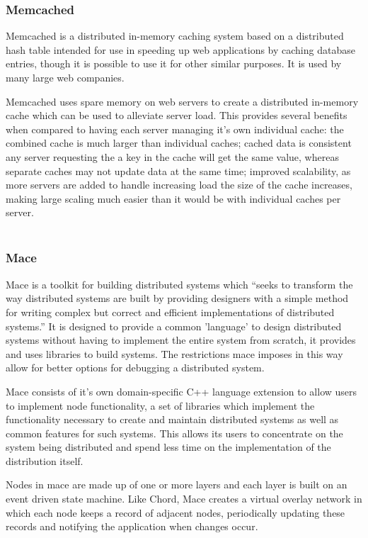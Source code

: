 \documentclass{article}
\begin{document}
\subsubsection{Memcached} 
Memcached\cite{memcached} is a distributed in-memory caching system based on a distributed hash table intended for use in speeding up web applications by caching database entries, though it is possible to use it for other similar purposes. It is used by many large web companies.

Memcached uses spare memory on web servers to create a distributed in-memory cache which can be used to alleviate server load. This provides several benefits when compared to having each server managing it's own individual cache: the combined cache is much larger than individual caches; cached data is consistent any server requesting the a key in the cache will get the same value, whereas separate caches may not update data at the same time; improved scalability, as more servers are added to handle increasing load the size of the cache increases, making large scaling much easier than it would be with individual caches per server.
\\
\\


\subsubsection{Mace} 
Mace\cite{mace} is a toolkit for building distributed systems which “seeks to transform the way distributed systems are built by providing designers with a simple method for writing complex but correct and efficient implementations of distributed systems.” \cite{mace_quote} It is designed to provide a common 'language' to design distributed systems without having to implement the entire system from scratch, it provides and uses libraries to build systems. The restrictions mace imposes in this way allow for better options for debugging a distributed system.

Mace consists of it's own domain-specific C++ language extension to allow users to implement node functionality, a set of libraries which implement the functionality necessary to create and maintain distributed systems as well as common features for such systems. This allows its users to concentrate on the system being distributed and spend less time on the implementation of the distribution itself.

Nodes in mace are made up of one or more layers and each layer is built on an event driven state machine. Like Chord, Mace creates a virtual overlay network in which each node keeps a record of adjacent nodes, periodically updating these records and notifying the application when changes occur.
\\
\\
\end{document}

